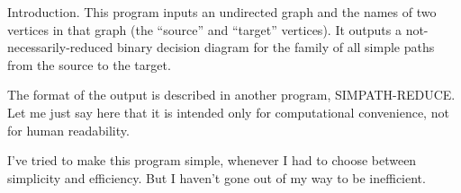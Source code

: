 
\datethis





Introduction. This program inputs an undirected graph and the names of
two
vertices in that graph (the ``source'' and ``target'' vertices).
It outputs a not-necessarily-reduced binary decision diagram
for the family of all simple paths from the source to the target.

The format of the output is described in another program,
{\mc SIMPATH-REDUCE}. Let me just say here that it is intended
only for computational convenience, not for human readability.

I've tried to make this program simple, whenever I had to
choose between simplicity and efficiency. But I haven't gone
out of my way to be inefficient.

